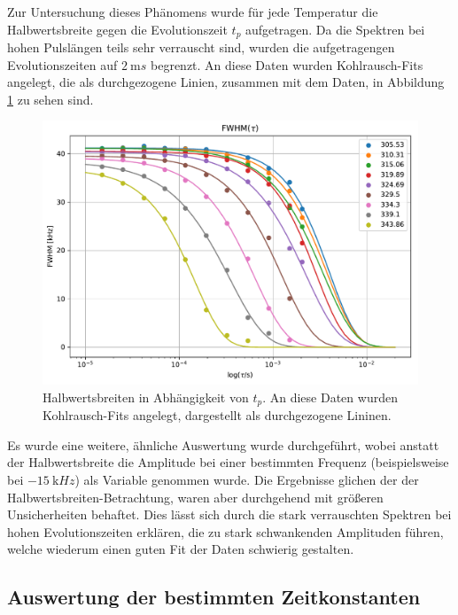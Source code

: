 Zur Untersuchung dieses Phänomens wurde für jede Temperatur die Halbwertsbreite gegen die Evolutionszeit $t_p$ aufgetragen. Da die Spektren bei hohen Pulslängen teils sehr verrauscht sind, wurden die aufgetragengen Evolutionszeiten auf $\SI{2}{\milli s}$ begrenzt. An diese Daten wurden Kohlrausch-Fits angelegt, die als durchgezogene Linien, zusammen mit dem Daten, in Abbildung \ref{fig:res:spekdyn_fits} zu sehen sind.
\begin{figure}
	\begin{center}
		\includegraphics[width=.9\textwidth]{graphics/plots/SPEKDYN/spekdyn_fits.pdf}
	\end{center}
	\caption{Halbwertsbreiten in Abhängigkeit von $t_p$. An diese Daten wurden Kohlrausch-Fits angelegt, dargestellt als durchgezogene Lininen.} \label{fig:res:spekdyn_fits}
\end{figure}

Es wurde eine weitere, ähnliche Auswertung wurde durchgeführt, wobei anstatt der Halbwertsbreite die Amplitude bei einer bestimmten Frequenz (beispielsweise bei $\SI{-15}{\kilo Hz}$) als Variable genommen wurde. Die Ergebnisse glichen der der Halbwertsbreiten-Betrachtung, waren aber durchgehend mit größeren Unsicherheiten behaftet. Dies lässt sich durch die stark verrauschten Spektren bei hohen Evolutionszeiten erklären, die zu stark schwankenden Amplituden führen, welche wiederum einen guten Fit der Daten schwierig gestalten.



\subsection{Auswertung der bestimmten Zeitkonstanten} \label{section:res:dynausw}

